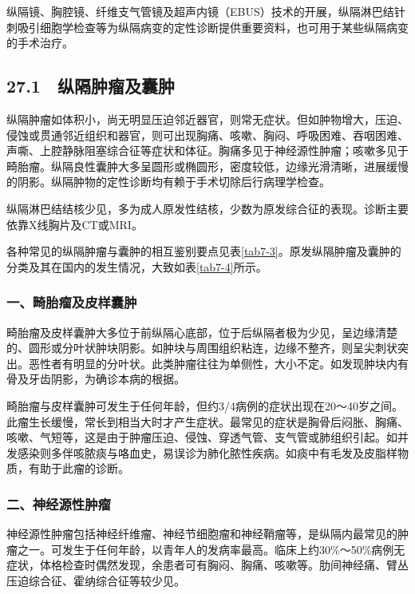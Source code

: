 纵隔镜、胸腔镜、纤维支气管镜及超声内镜（EBUS）技术的开展，纵隔淋巴结针刺吸引细胞学检查等为纵隔病变的定性诊断提供重要资料，也可用于某些纵隔病变的手术治疗。

\subsection{27.1　纵隔肿瘤及囊肿}

纵隔肿瘤如体积小，尚无明显压迫邻近器官，则常无症状。但如肿物增大，压迫、侵蚀或贯通邻近组织和器官，则可出现胸痛、咳嗽、胸闷、呼吸困难、吞咽困难、声嘶、上腔静脉阻塞综合征等症状和体征。胸痛多见于神经源性肿瘤；咳嗽多见于畸胎瘤。纵隔良性囊肿大多呈圆形或椭圆形，密度较低，边缘光滑清晰，进展缓慢的阴影。纵隔肿物的定性诊断均有赖于手术切除后行病理学检查。

纵隔淋巴结结核少见，多为成人原发性结核，少数为原发综合征的表现。诊断主要依靠X线胸片及CT或MRI。

各种常见的纵隔肿瘤与囊肿的相互鉴别要点见表\ref{tab7-3}。原发纵隔肿瘤及囊肿的分类及其在国内的发生情况，大致如表\ref{tab7-4}所示。

\subsubsection{一、畸胎瘤及皮样囊肿}

畸胎瘤及皮样囊肿大多位于前纵隔心底部，位于后纵隔者极为少见，呈边缘清楚的、圆形或分叶状肿块阴影。如肿块与周围组织粘连，边缘不整齐，则呈尖刺状突出。恶性者有明显的分叶状。此类肿瘤往往为单侧性，大小不定。如发现肿块内有骨及牙齿阴影，为确诊本病的根据。

畸胎瘤与皮样囊肿可发生于任何年龄，但约3/4病例的症状出现在20～40岁之间。此瘤生长缓慢，常长到相当大时才产生症状。最常见的症状是胸骨后闷胀、胸痛、咳嗽、气短等，这是由于肿瘤压迫、侵蚀、穿透气管、支气管或肺组织引起。如并发感染则多伴咳脓痰与咯血史，易误诊为肺化脓性疾病。如痰中有毛发及皮脂样物质，有助于此瘤的诊断。

\subsubsection{二、神经源性肿瘤}

神经源性肿瘤包括神经纤维瘤、神经节细胞瘤和神经鞘瘤等，是纵隔内最常见的肿瘤之一。可发生于任何年龄，以青年人的发病率最高。临床上约30\%～50\%病例无症状，体格检查时偶然发现，余患者可有胸闷、胸痛、咳嗽等。肋间神经痛、臂丛压迫综合征、霍纳综合征等较少见。

